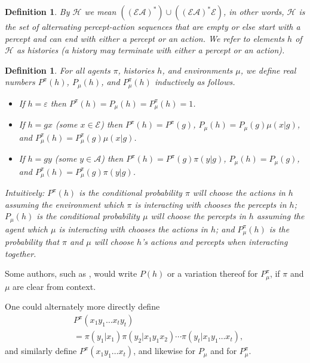 \documentclass[twoside]{article}
\newtheorem{definition}[theorem]{Definition}
\begin{document}
\begin{definition}
    By $\mathcal H$ we mean
    $((\mathcal E\mathcal A)^*)\cup((\mathcal E\mathcal A)^*\mathcal E)$,
    in other words, $\mathcal H$ is the set of alternating percept-action
    sequences that are empty or else start with a percept and can end with
    either a percept or an action.
    We refer to elements $h$ of $\mathcal H$ as \emph{histories} (a history
    may terminate with either a percept or an action).
\end{definition}

\begin{definition}
\label{pullbackdef}
    For all agents $\pi$, histories $h$, and environments $\mu$,
    we define real numbers $P^\pi(h)$, $P_\mu(h)$, and $P^\pi_\mu(h)$
    inductively as follows.
    \begin{itemize}
        \item
        If $h=\varepsilon$ then $P^\pi(h)=P_\mu(h)=P^\pi_\mu(h)=1$.
        \item
        If $h=gx$ (some $x\in\mathcal E$) then
        $P^\pi(h)=P^\pi(g)$, $P_\mu(h)=P_\mu(g)\mu(x|g)$,
        and $P^\pi_\mu(h)=P^\pi_\mu(g)\mu(x|g)$.
        \item
        If $h=gy$ (some $y\in\mathcal A$) then
        $P^\pi(h)=P^\pi(g)\pi(y|g)$, $P_\mu(h)=P_\mu(g)$,
        and $P^\pi_\mu(h)=P^\pi_\mu(g)\pi(y|g)$.
    \end{itemize}
    Intuitively: $P^\pi(h)$ is the conditional
    probability $\pi$ will choose the actions in $h$ assuming the
    environment which $\pi$ is interacting with chooses the percepts in
    $h$; $P_\mu(h)$ is the conditional probability $\mu$ will choose
    the percepts in $h$ assuming the agent which $\mu$ is interacting
    with chooses the actions in $h$; and $P^\pi_\mu(h)$ is the probability
    that $\pi$ and $\mu$ will choose $h$'s actions and percepts when
    interacting together.
\end{definition}

Some authors, such as \cite{hutter2009discrete}, would write $P(h)$ or a variation thereof
for $P^\pi_\mu$, if $\pi$ and $\mu$ are clear from context.

One could alternately more directly define
\begin{align*}
    {} & P^\pi(x_1y_1\ldots x_ty_t)\\
    &= \pi(y_1|x_1)\pi(y_2|x_1y_1x_2)\cdots \pi(y_t|x_1y_1\ldots x_t),
\end{align*}
and similarly define $P^\pi(x_1y_1\ldots x_t)$,
and likewise for $P_\mu$ and for $P^\pi_\mu$.
\end{document}
